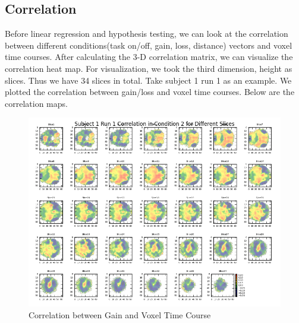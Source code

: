 \subsection{Correlation}
\noindent
Before linear regression and hypothesis testing, we can look at the correlation between different conditions(task on/off, gain, loss, distance) vectors and voxel time courses. After calculating the 3-D correlation matrix, we can visualize the correlation heat map.  For visualization, we took the third dimension, height as slices. Thus we have 34 slices in total. Take subject 1  run 1 as an example.
We plotted the correlation between gain/loss and voxel time courses. Below are the correlation maps.

        

\begin{figure}[H]
    \centering
        \includegraphics[scale=0.5]{../plots/correlation_s1r1c2.png}
    \caption{Correlation between Gain and Voxel Time Course}
\end{figure}


